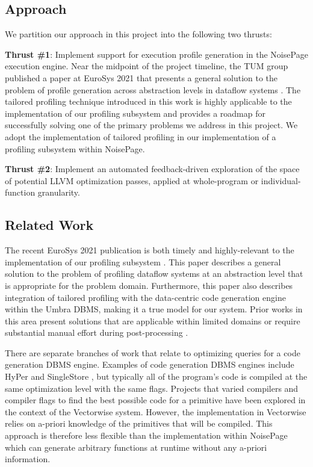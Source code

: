 \documentclass{vldb}
\begin{document}
\subsection{Approach}

We partition our approach in this project into the following two thrusts:

\textbf{Thrust \#1}: Implement support for execution profile generation in the NoisePage execution engine. Near the midpoint of the project timeline, the TUM group published a paper at EuroSys 2021 that presents a general solution to the problem of profile generation across abstraction levels in dataflow systems \cite{beischl21}. The tailored profiling technique introduced in this work is highly applicable to the implementation of our profiling subsystem and provides a roadmap for successfully solving one of the primary problems we address in this project. We adopt the implementation of tailored profiling in  our implementation of a profiling subsystem within NoisePage. 

\textbf{Thrust \#2}: Implement an automated feedback-driven exploration of the space of potential LLVM optimization passes, applied at whole-program or individual-function granularity.

\subsection{Related Work}

The recent EuroSys 2021 publication is both timely and highly-relevant to the implementation of our profiling subsystem \cite{beischl21}. This paper describes a general solution to the problem of profiling dataflow systems at an abstraction level that is appropriate for the problem domain. Furthermore, this paper also describes integration of tailored profiling with the data-centric code generation engine within the Umbra \cite{umbra} DBMS, making it a true model for our system. Prior works in this area present solutions that are applicable within limited domains \cite{stuart20} or require substantial manual effort during post-processing \cite{noll20}.

There are separate branches of work that relate to optimizing queries for a code generation DBMS engine. Examples of code generation DBMS engines include HyPer \cite{hyper} and SingleStore \cite{singlestore}, but typically all of the program's code is compiled at the same optimization level with the same flags. Projects that varied compilers and compiler flags to find the best possible code for a primitive have been explored in the context of the Vectorwise \cite{raducanu12} system. However, the implementation in Vectorwise relies on a-priori knowledge of the primitives that will be compiled. This approach is therefore less flexible than the implementation within NoisePage which can generate arbitrary functions at runtime without any a-priori information.
\end{document}
